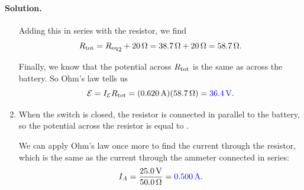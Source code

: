 \documentclass[11pt]{article}
\newcommand{\beq}{\begin{equation*}}
\newcommand{\eeq}{\end{equation*}}
\newenvironment{solution}
{
    \paragraph{Solution.}
    \ignorespaces
}
{
    \bigskip
}
\begin{document}
\begin{solution}
\begin{enumerate}
		\vspace{1.5in}
				
		Adding this in series with the  resistor, we find
		\beq
			\Rtot = {\Req}_2 + \Sohm{20}
			= \Sohm{38.7} + \Sohm{20}
			= \Sohm{58.7}.
		\eeq
		
		\vspace{1.5in}
				
		Finally, we know that the potential across $R_\text{tot}$ is the same as across the battery.  So Ohm's law tells us
		\beq
			\cE = I_\cE \Rtot
			= (\Samp{0.620}) (\Sohm{58.7})
			= {\color{blue} \Svolt{36.4}}.
		\eeq
		
		\item When the switch is closed, the  resistor is connected in parallel to the  battery, so the potential across the  resistor is equal to .

		\vspace{1.5in}

		We can apply Ohm's law once more to find the current through the  resistor, which is the same as the current through the ammeter connected in series:
		\beq
			I_A = \frac{\Svolt{25.0}}{\Sohm{50.0}}
			= {\color{blue} \Samp{0.500}}.
		\eeq
	\end{enumerate}
\end{solution}



\clearpage

\newcommand{\Qo}{Q_0}
\newcommand{\Vo}{V_0}
\newcommand{\Ceq}{C_\text{eq}}
\end{document}
